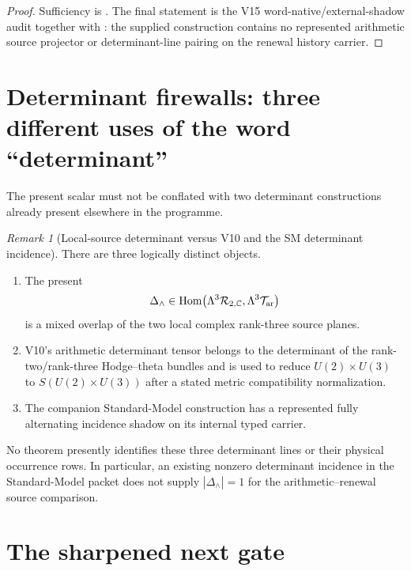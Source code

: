\documentclass[11pt]{article}
\theoremstyle{definition}
\theoremstyle{remark}
\newtheorem{remark}[remark]{Remark}
\begin{document}
\begin{proof}
Sufficiency is .
The final statement is the V15 word-native/external-shadow audit together with
: the supplied construction contains no
represented arithmetic source projector or determinant-line pairing on the
renewal history carrier.
\end{proof}

\section{Determinant firewalls: three different uses of the word ``determinant''}
\label{sec:v16-det-firewall}

The present scalar must not be conflated with two determinant constructions
already present elsewhere in the programme.

\begin{remark}[Local-source determinant versus V10 and the SM determinant incidence]
\label{fire:v16-three-dets}
There are three logically distinct objects.
\begin{enumerate}[label=\textup{(D\arabic*)},leftmargin=3em]
\item The present
\[
 \Delta_\wedge
 \in
 \operatorname{Hom}\bigl(\Lambda^3\mathcal R_{2,\mathbb C},
           \Lambda^3\mathcal T_{\rm ar}\bigr)
\]
is a mixed overlap of the two local complex rank-three source planes.
\item V10's arithmetic determinant tensor belongs to the determinant of the
rank-two/rank-three Hodge--theta bundles and is used to reduce
$U(2)\times U(3)$ to $S(U(2)\times U(3))$ after a stated metric
compatibility normalization.
\item The companion Standard-Model construction has a represented fully
alternating incidence shadow on its internal typed carrier.
\end{enumerate}
No theorem presently identifies these three determinant lines or their
physical occurrence rows.  In particular, an existing nonzero determinant
incidence in the Standard-Model packet does not supply
$|\Delta_\wedge|=1$ for the arithmetic--renewal source comparison.
\end{remark}

\section{The sharpened next gate}
\label{sec:v16-status}
\end{document}
